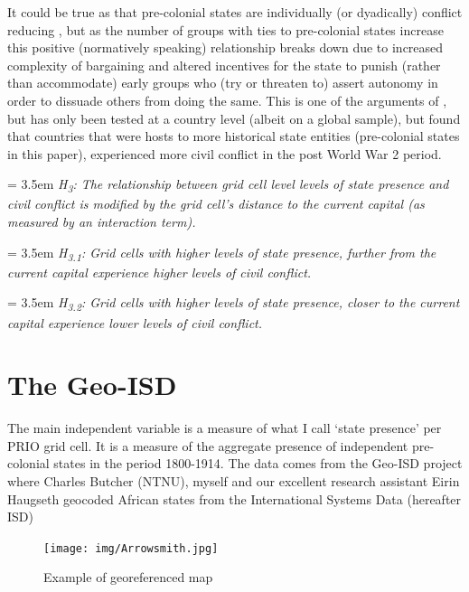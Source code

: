 \documentclass[12pt]{article}
\begin{document}
\begin{multicols}{2}
It could be true as that pre-colonial states are individually (or dyadically)
conflict reducing \citep{Pinker2012, Wig2016}, but as the number of groups with
ties to pre-colonial states increase this positive (normatively speaking)
relationship breaks down due to increased complexity of bargaining
\citep{Walter2009} and altered incentives for the state to punish (rather than
accommodate) early groups who (try or threaten to) assert autonomy in order to
dissuade others from doing the same. This is one of the arguments of
\citet{Wishman}, but has only been tested at a country level (albeit on a global
sample), but found that countries that were hosts to more historical state
entities (pre-colonial states in this paper), experienced more civil conflict in
the post World War 2 period. 

\bigskip

\hangindent = 3.5em \textit{H\textsubscript{3}: The relationship between grid
cell level levels of state presence and civil conflict is modified by the grid
cell's distance to the current capital (as measured by an interaction term).}

\bigskip

\hangindent = 3.5em \textit{H\textsubscript{3.1}: Grid cells with higher levels of
state presence, further from the current capital experience higher levels of
civil conflict.}

\bigskip

\hangindent = 3.5em \textit{H\textsubscript{3.2}: Grid cells with higher
levels of state presence, closer to the current capital experience lower levels
of civil conflict.} 

\bigskip

\section{The Geo-ISD}

The main independent variable is a measure of what I call `state presence' per
PRIO grid cell. It is a measure of the aggregate presence of independent
pre-colonial states in the period 1800-1914. The data comes from the Geo-ISD
project where Charles Butcher (NTNU), myself and our excellent research
assistant Eirin Haugseth geocoded African states from the International Systems
Data (hereafter ISD) \citep{Griffiths2013}

\end{multicols}

\begin{figure}[htpb]
	\centering
	\texttt{[image: img/Arrowsmith.jpg]}
	\caption{Example of georeferenced map}%
	\label{fig:Arrowsmith}
\end{figure}
\end{document}

